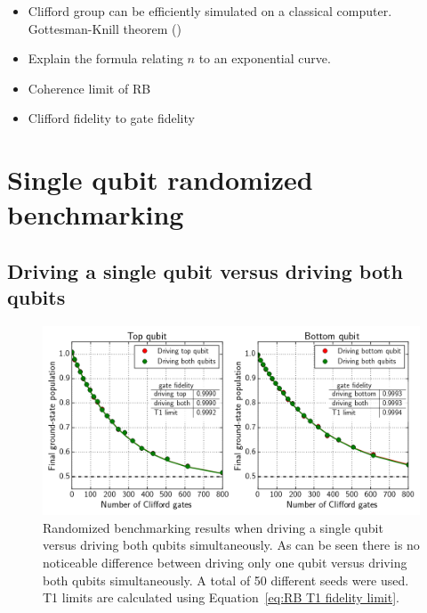       \begin{itemize}
        \item Clifford group can be efficiently simulated on a classical computer. Gottesman-Knill theorem (\cite{gottesman1998heisenberg})
        \item Explain the formula relating $n$ to an exponential curve.
        \item Coherence limit of RB
        \item Clifford fidelity to gate fidelity
      \end{itemize}

    \section{Single qubit randomized benchmarking}
      \label{sec:Single qubit randomized benchmarking}
      \subsection{Driving a single qubit versus driving both qubits}
        \label{ssec:Driving a single qubit versus driving both qubits}

        \begin{figure}[tb]
          \centering
          \includegraphics[width=\textwidth]{../Figures/Randomized benchmarking/RB_normal_driving_single_both.png}
          \caption{Randomized benchmarking results when driving a single qubit versus driving both qubits simultaneously. As can be seen there is no noticeable difference between driving only one qubit versus driving both qubits simultaneously. A total of 50 different seeds were used. T1 limits are calculated using Equation~\ref{eq:RB T1 fidelity limit}.}
          \label{fig:RB normal single vs both}
        \end{figure}

